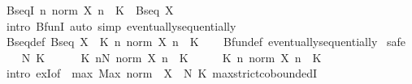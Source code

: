\begin{isabellebody}
\isamarkupfalse%
%
\endisatagproof
{\isafoldproof}%
%
\isadelimproof
%
\endisadelimproof
%
\isadelimdocument
%
\endisadelimdocument
%
\isatagdocument
%
\isamarkuptrue%
%
\endisatagdocument
{\isafolddocument}%
%
\isadelimdocument
%
\endisadelimdocument
{}\isamarkupfalse%
\ BseqI{\isacharprime}{\kern0pt}{\isacharcolon}{\kern0pt}\ {\isachardoublequoteopen}{\isacharparenleft}{\kern0pt}{\isasymAnd}n{\isachardot}{\kern0pt}\ norm\ {\isacharparenleft}{\kern0pt}X\ n{\isacharparenright}{\kern0pt}\ {\isasymle}\ K{\isacharparenright}{\kern0pt}\ {\isasymLongrightarrow}\ Bseq\ X{\isachardoublequoteclose}\isanewline
%
\isadelimproof
\ \ %
\endisadelimproof
%
\isatagproof
{}\isamarkupfalse%
\ {\isacharparenleft}{\kern0pt}intro\ BfunI{\isacharparenright}{\kern0pt}\ {\isacharparenleft}{\kern0pt}auto\ simp{\isacharcolon}{\kern0pt}\ eventually{\isacharunderscore}{\kern0pt}sequentially{\isacharparenright}{\kern0pt}%
\endisatagproof
{\isafoldproof}%
%
\isadelimproof
\isanewline
%
\endisadelimproof
\isanewline
{}\isamarkupfalse%
\ Bseq{\isacharunderscore}{\kern0pt}def{\isacharcolon}{\kern0pt}\ {\isachardoublequoteopen}Bseq\ X\ {\isasymlongleftrightarrow}\ {\isacharparenleft}{\kern0pt}{\isasymexists}K{\isachargreater}{\kern0pt}{}{\isachardot}{\kern0pt}\ {\isasymforall}n{\isachardot}{\kern0pt}\ norm\ {\isacharparenleft}{\kern0pt}X\ n{\isacharparenright}{\kern0pt}\ {\isasymle}\ K{\isacharparenright}{\kern0pt}{\isachardoublequoteclose}\isanewline
%
\isadelimproof
\ \ %
\endisadelimproof
%
\isatagproof
{}\isamarkupfalse%
\ Bfun{\isacharunderscore}{\kern0pt}def\ eventually{\isacharunderscore}{\kern0pt}sequentially\isanewline
{}\isamarkupfalse%
\ safe\isanewline
\ \ \isamarkupfalse%
\ N\ K\isanewline
\ \ \isamarkupfalse%
\ {\isachardoublequoteopen}{}\ {\isacharless}{\kern0pt}\ K{\isachardoublequoteclose}\ {\isachardoublequoteopen}{\isasymforall}n{\isasymge}N{\isachardot}{\kern0pt}\ norm\ {\isacharparenleft}{\kern0pt}X\ n{\isacharparenright}{\kern0pt}\ {\isasymle}\ K{\isachardoublequoteclose}\isanewline
\ \ \isamarkupfalse%
\ \isamarkupfalse%
\ {\isachardoublequoteopen}{\isasymexists}K{\isachargreater}{\kern0pt}{}{\isachardot}{\kern0pt}\ {\isasymforall}n{\isachardot}{\kern0pt}\ norm\ {\isacharparenleft}{\kern0pt}X\ n{\isacharparenright}{\kern0pt}\ {\isasymle}\ K{\isachardoublequoteclose}\isanewline
\ \ \ \ \isamarkupfalse%
\ {\isacharparenleft}{\kern0pt}intro\ exI{\isacharbrackleft}{\kern0pt}of\ {\isacharunderscore}{\kern0pt}\ {\isachardoublequoteopen}max\ {\isacharparenleft}{\kern0pt}Max\ {\isacharparenleft}{\kern0pt}norm\ {\isacharbackquote}{\kern0pt}\ X\ {\isacharbackquote}{\kern0pt}\ {\isacharbraceleft}{\kern0pt}{\isachardot}{\kern0pt}{\isachardot}{\kern0pt}N{\isacharbraceright}{\kern0pt}{\isacharparenright}{\kern0pt}{\isacharparenright}{\kern0pt}\ K{\isachardoublequoteclose}{\isacharbrackright}{\kern0pt}\ max{\isachardot}{\kern0pt}strict{\isacharunderscore}{\kern0pt}coboundedI{}{\isacharparenright}{\kern0pt}\isanewline

\end{isabellebody}
